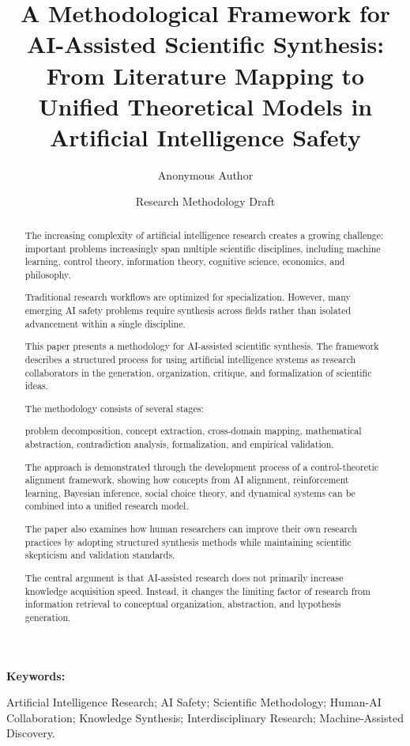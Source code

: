 \documentclass[11pt]{article}
\title{
A Methodological Framework for AI-Assisted Scientific Synthesis:
\\
From Literature Mapping to Unified Theoretical Models in Artificial
Intelligence Safety
}
\author{
Anonymous Author
}
\date{
Research Methodology Draft
}
\begin{document}
\maketitle


\begin{abstract}


The increasing complexity of artificial intelligence research creates a
growing challenge: important problems increasingly span multiple
scientific disciplines, including machine learning, control theory,
information theory, cognitive science, economics, and philosophy.

Traditional research workflows are optimized for specialization.
However, many emerging AI safety problems require synthesis across
fields rather than isolated advancement within a single discipline.

This paper presents a methodology for AI-assisted scientific synthesis.
The framework describes a structured process for using artificial
intelligence systems as research collaborators in the generation,
organization, critique, and formalization of scientific ideas.

The methodology consists of several stages:

problem decomposition,
concept extraction,
cross-domain mapping,
mathematical abstraction,
contradiction analysis,
formalization,
and empirical validation.

The approach is demonstrated through the development process of a
control-theoretic alignment framework, showing how concepts from AI
alignment, reinforcement learning, Bayesian inference, social choice
theory, and dynamical systems can be combined into a unified research
model.

The paper also examines how human researchers can improve their own
research practices by adopting structured synthesis methods while
maintaining scientific skepticism and validation standards.

The central argument is that AI-assisted research does not primarily
increase knowledge acquisition speed. Instead, it changes the limiting
factor of research from information retrieval to conceptual
organization, abstraction, and hypothesis generation.

\end{abstract}



\textbf{Keywords:}

Artificial Intelligence Research;
AI Safety;
Scientific Methodology;
Human-AI Collaboration;
Knowledge Synthesis;
Interdisciplinary Research;
Machine-Assisted Discovery.
\end{document}
